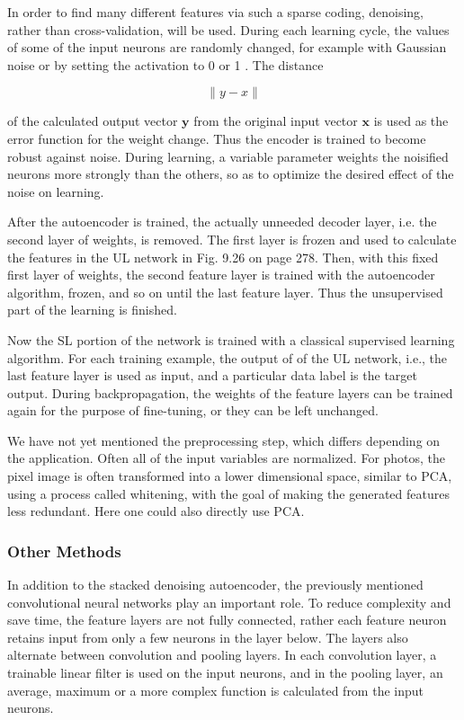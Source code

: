\documentclass[10pt]{book}
\begin{document}
In order to find many different features via such a sparse coding, denoising, rather than cross-validation, will be used. During each learning cycle, the values of some of the input neurons are randomly changed, for example with Gaussian noise or by setting the activation to 0 or 1 . The distance


$$
\|y-x\|
$$

of the calculated output vector $\boldsymbol{y}$ from the original input vector $\boldsymbol{x}$ is used as the error function for the weight change. Thus the encoder is trained to become robust against noise. During learning, a variable parameter weights the noisified neurons more strongly than the others, so as to optimize the desired effect of the noise on learning.

After the autoencoder is trained, the actually unneeded decoder layer, i.e. the second layer of weights, is removed. The first layer is frozen and used to calculate the features in the UL network in Fig. 9.26 on page 278. Then, with this fixed first layer of weights, the second feature layer is trained with the autoencoder algorithm, frozen, and so on until the last feature layer. Thus the unsupervised part of the learning is finished.

Now the SL portion of the network is trained with a classical supervised learning algorithm. For each training example, the output of of the UL network, i.e., the last feature layer is used as input, and a particular data label is the target output. During backpropagation, the weights of the feature layers can be trained again for the purpose of fine-tuning, or they can be left unchanged.

We have not yet mentioned the preprocessing step, which differs depending on the application. Often all of the input variables are normalized. For photos, the pixel image is often transformed into a lower dimensional space, similar to PCA, using a process called whitening, with the goal of making the generated features less redundant. Here one could also directly use PCA.

\subsubsection*{Other Methods}
In addition to the stacked denoising autoencoder, the previously mentioned convolutional neural networks play an important role. To reduce complexity and save time, the feature layers are not fully connected, rather each feature neuron retains input from only a few neurons in the layer below. The layers also alternate between convolution and pooling layers. In each convolution layer, a trainable linear filter is used on the input neurons, and in the pooling layer, an average, maximum or a more complex function is calculated from the input neurons.
\end{document}
